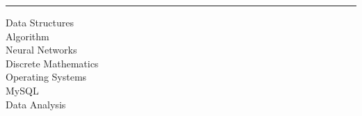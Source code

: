 
\noindent\rule{5cm}{0.4pt}
\vspace{0.2cm}

Data Structures\\
Algorithm\\
Neural Networks\\
Discrete Mathematics\\
Operating Systems\\
MySQL\\
Data Analysis
\sectionsep